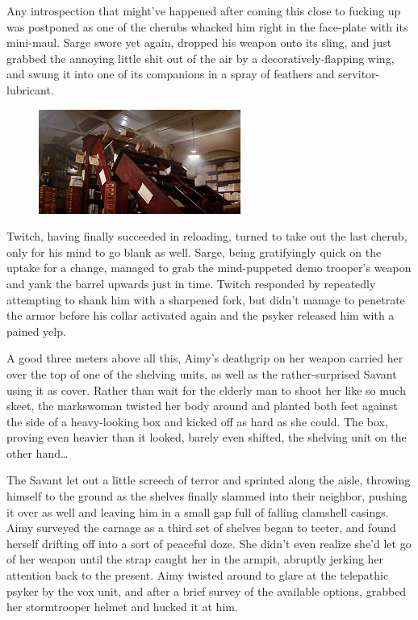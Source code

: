 Any introspection that might've happened after coming this close to fucking up was postponed as one of the cherubs whacked him right in the face-plate with its mini-maul. 
Sarge swore yet again, dropped his weapon onto its sling, and just grabbed the annoying little shit out of the air by a decoratively-flapping wing, and swung it into one of its companions in a spray of feathers and servitor-lubricant.

\begin{figure}
	\begin{center}
		\includegraphics[width=\figwidth]{pics/21/89.png}
	\end{center}
\end{figure}
Twitch, having finally succeeded in reloading, turned to take out the last cherub, only for his mind to go blank as well. 
Sarge, being gratifyingly quick on the uptake for a change, managed to grab the mind-puppeted demo trooper's weapon and yank the barrel upwards just in time. 
Twitch responded by repeatedly attempting to shank him with a sharpened fork, but didn't manage to penetrate the armor before his collar activated again and the psyker released him with a pained yelp.

A good three meters above all this, Aimy's deathgrip on her weapon carried her over the top of one of the shelving units, as well as the rather-surprised Savant using it as cover. 
Rather than wait for the elderly man to shoot her like so much skeet, the markswoman twisted her body around and planted both feet against the side of a heavy-looking box and kicked off as hard as she could. 
The box, proving even heavier than it looked, barely even shifted, the shelving unit on the other hand…

The Savant let out a little screech of terror and sprinted along the aisle, throwing himself to the ground as the shelves finally slammed into their neighbor, pushing it over as well and leaving him in a small gap full of falling clamshell casings. 
Aimy surveyed the carnage as a third set of shelves began to teeter, and found herself drifting off into a sort of peaceful doze. 
She didn't even realize she'd let go of her weapon until the strap caught her in the armpit, abruptly jerking her attention back to the present. 
Aimy twisted around to glare at the telepathic psyker by the vox unit, and after a brief survey of the available options, grabbed her stormtrooper helmet and hucked it at him.

